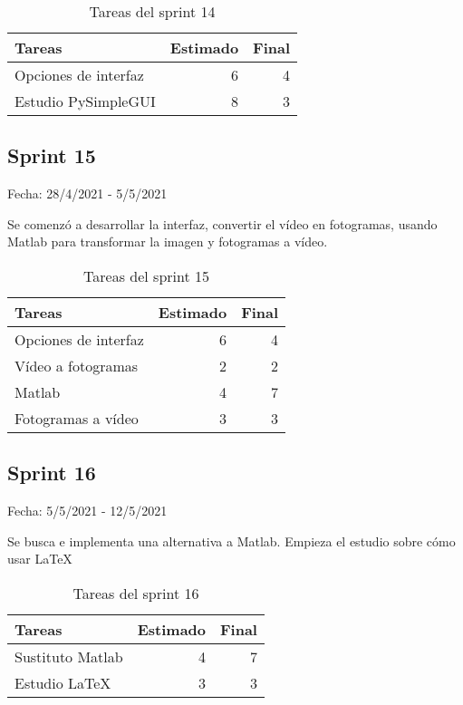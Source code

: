     \begin{table}[H]
    	 \begin{tabularx}{\linewidth}{X r r}
    	 	\toprule \textbf{Tareas} & \textbf{Estimado} & \textbf{Final}\\
    	 	\toprule
         	Opciones de interfaz   & 6 & 4 \\
		    Estudio PySimpleGUI & 8 & 3\\
    	 	\bottomrule
    	 \end{tabularx}
    	 \caption{Tareas del sprint 14}
    \end{table}
    
\subsection{Sprint 15}

    Fecha: 28/4/2021 - 5/5/2021
    
    Se comenzó a desarrollar la interfaz, convertir el vídeo en fotogramas, usando Matlab para transformar la imagen y fotogramas a vídeo.
    
    \begin{table}[H]
    	 \begin{tabularx}{\linewidth}{X r r}
    	 	\toprule \textbf{Tareas} & \textbf{Estimado} & \textbf{Final}\\
    	 	\toprule
         	Opciones de interfaz   & 6 & 4 \\
		    Vídeo a fotogramas  & 2 & 2\\
		    Matlab & 4 & 7 \\
	    	Fotogramas a vídeo & 3 & 3 \\
    	 	\bottomrule
    	 \end{tabularx}
    	 \caption{Tareas del sprint 15}
    \end{table}

\subsection{Sprint 16}

    Fecha: 5/5/2021 - 12/5/2021
    
    Se busca e implementa una alternativa a Matlab. Empieza el estudio sobre cómo usar \LaTeX
    
    \begin{table}[H]
    	 \begin{tabularx}{\linewidth}{X r r}
    	 	\toprule \textbf{Tareas} & \textbf{Estimado} & \textbf{Final}\\
    	 	\toprule
		    Sustituto Matlab & 4 & 7 \\
		    Estudio \LaTeX & 3 & 3 \\
    	 	\bottomrule
    	 \end{tabularx}
    	 \caption{Tareas del sprint 16}
    \end{table}


